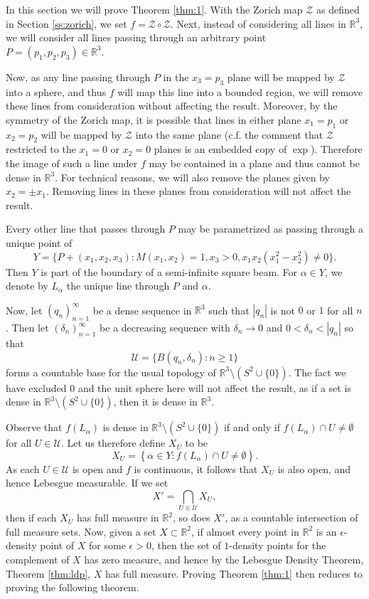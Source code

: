 \documentclass[11pt]{amsart}
\numberwithin{equation}{section}
\theoremstyle{definition}
\theoremstyle{definition}
\theoremstyle{definition}
\newcommand{\R}{\mathbb{R}}
\begin{document}
In this section we will prove Theorem \ref{thm:1}. With the Zorich map $\mathcal{Z}$ as defined in Section \ref{ss:zorich}, we set $f = \mathcal{Z} \circ \mathcal{Z}$. Next, instead of considering all lines in $\R^3$, we will consider all lines passing through an arbitrary point $P=(p_1,p_2,p_3) \in \R^3$. 

Now, as any line passing through $P$ in the $x_3 = p_3$ plane will be mapped by $\mathcal{Z}$ into a sphere, and thus $f$ will map this line into a bounded region, we will remove these lines from consideration without affecting the result. Moreover, by the symmetry of the Zorich map, it is possible that lines in either plane $x_1 = p_1$ or $x_2 = p_2$ will be mapped by $\mathcal{Z}$ into the same plane (c.f. the comment that $\mathcal{Z}$ restricted to the $x_1= 0$ or $x_2=0$ planes is an embedded copy of $\exp$). Therefore the image of such a line under $f$ may be contained in a plane and thus cannot be dense in $\R^3$. For technical reasons, we will also remove the planes given by $x_2 = \pm x_1$. Removing lines in these planes from consideration will not affect the result.

Every other line that passes through $P$ may be parametrized as passing through a unique point of 
\begin{equation}
    \label{eq:para}
Y = \{ P+(x_1,x_2,x_3) : M(x_1,x_2)=1, x_3>0, x_1x_2(x_1^2-x_2^2)\neq 0 \}. 
\end{equation}
Then $Y$ is part of the boundary of a semi-infinite square beam. For $\alpha \in Y$, we denote by $L_{\alpha}$ the unique line through $P$ and $\alpha$.

Now, let $(q_n)_{n=1}^{\infty}$ be a dense sequence in $\R^3$ such that $|q_n|$ is not $0$ or $1$ for all $n$. Then let $(\delta_n)_{n=1}^{\infty}$ be a decreasing sequence with $\delta_n \to 0$ and $0<\delta_n < |q_n|$ so that 
\[ \mathcal{U} = \{ B(q_n,\delta_n) : n\geq 1 \} \]
forms a countable base for the usual topology of $\R^3 \setminus (S^{2} \cup \{ 0 \})$. The fact we have excluded $0$ and the unit sphere here will not affect the result, as if a set is dense in $\R^3 \setminus (S^{2} \cup \{ 0 \})$, then it is dense in $\R^3$.

Observe that $f(L_{\alpha})$ is dense in $\R^3 \setminus (S^{2} \cup \{ 0 \})$ if and only if $f(L_{\alpha}) \cap U \neq \emptyset$ for all $U\in \mathcal{U}$. Let us therefore define $X_U$ to be
\[ X_U = \left \{ \alpha \in Y : f(L_{\alpha}) \cap U \neq \emptyset \right \}.\]
As each $U \in \mathcal{U}$ is open and $f$ is continuous, it follows that $X_U$ is also open, and hence Lebesgue measurable. If we set 
\[ X' = \bigcap_{U \in \mathcal{U}} X_U,\]
then if each $X_U$ has full measure in $\R^2$, so does $X'$, as a countable intersection of full measure sets. Now, given a set $X\subset \R^2$, if almost every point in $\R^2$ is an $\epsilon$-density point of $X$ for some $\epsilon >0$, then the set of $1$-density points for the complement of $X$ has zero measure, and hence by the Lebesgue Density Theorem, Theorem \ref{thm:ldp}, $X$ has full measure. Proving Theorem \ref{thm:1} then reduces to proving the following theorem.
\end{document}
